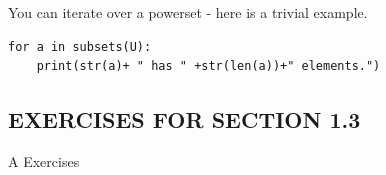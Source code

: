 \documentclass[10pt,]{book}
\theoremstyle{plain}
\theoremstyle{definition}
\begin{document}
You can iterate over a powerset - here is a trivial example.  
%
\begin{lstlisting}[style=sageinput]
for a in subsets(U):
    print(str(a)+ " has " +str(len(a))+" elements.")
\end{lstlisting}
\typeout{************************************************}
\typeout{************************************************}
\subsection[EXERCISES FOR SECTION 1.3 ]{EXERCISES FOR SECTION 1.3 }\label{exercises-1.3}
\hypertarget{exercisegroup-5}{}\typeout{************************************************}
\typeout{************************************************}
A Exercises%
\end{document}
